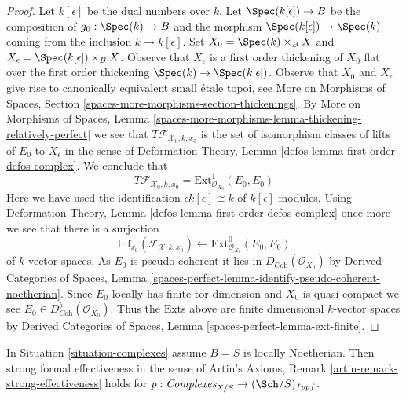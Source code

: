 \begin{proof}
\medskip\noindent
Let $k[\epsilon]$ be the dual numbers over $k$.
Let $\Spec(k[\epsilon]) \to B$ be the composition of $g_0 : \Spec(k) \to B$
and the morphism $\Spec(k[\epsilon]) \to \Spec(k)$
coming from the inclusion $k \to k[\epsilon]$.
Set $X_0 = \Spec(k) \times_B X$ and
$X_\epsilon = \Spec(k[\epsilon]) \times_B X$.
Observe that $X_\epsilon$ is a first order thickening of $X_0$
flat over the first order thickening $\Spec(k) \to \Spec(k[\epsilon])$.
Observe that $X_0$ and $X_\epsilon$ give rise to canonically equivalent
small \'etale topoi, see
More on Morphisms of Spaces, Section
\ref{spaces-more-morphisms-section-thickenings}.
By More on Morphisms of Spaces, Lemma
\ref{spaces-more-morphisms-lemma-thickening-relatively-perfect}
we see that $T\mathcal{F}_{\mathcal{X}_0, k, x_0}$ is the set of
isomorphism classes of lifts of $E_0$ to $X_\epsilon$ in the sense of
Deformation Theory, Lemma \ref{defos-lemma-first-order-defos-complex}.
We conclude that
$$
T\mathcal{F}_{\mathcal{X}_0, k, x_0} =
\text{Ext}^1_{\mathcal{O}_{X_0}}(E_0, E_0)
$$
Here we have used the identification $\epsilon k[\epsilon] \cong k$
of $k[\epsilon]$-modules. Using
Deformation Theory, Lemma \ref{defos-lemma-first-order-defos-complex}
once more we see that there is a surjection
$$
\text{Inf}_{x_0}(\mathcal{F}_{\mathcal{X}, k, x_0})
\leftarrow
\text{Ext}^0_{\mathcal{O}_{X_0}}(E_0, E_0)
$$
of $k$-vector spaces. As $E_0$ is pseudo-coherent it lies in
$D^-_{\textit{Coh}}(\mathcal{O}_{X_0})$ by
Derived Categories of Spaces, Lemma
\ref{spaces-perfect-lemma-identify-pseudo-coherent-noetherian}.
Since $E_0$ locally has finite tor dimension and $X_0$
is quasi-compact we see $E_0 \in D^b_{\textit{Coh}}(\mathcal{O}_{X_0})$.
Thus the $\text{Ext}$s above are finite dimensional $k$-vector spaces
by Derived Categories of Spaces, Lemma
\ref{spaces-perfect-lemma-ext-finite}.
\end{proof}

\begin{lemma}
\label{lemma-complexes-strong-effectiveness}
In Situation \ref{situation-complexes} assume $B = S$ is locally Noetherian.
Then strong formal effectiveness in the sense of
Artin's Axioms, Remark \ref{artin-remark-strong-effectiveness}
holds for $p : \textit{Complexes}_{X/S} \to (\Sch/S)_{fppf}$.
\end{lemma}

